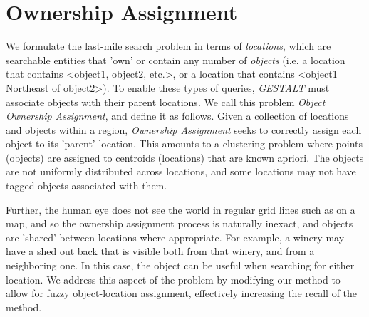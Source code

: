 \section{Ownership Assignment}
\label{section:ownership}

We formulate the last-mile search problem in terms of \textit{locations}, which are searchable entities that 'own' or contain any number of \textit{objects} (i.e. a location that contains <object1, object2, etc.>, or a location that contains <object1 Northeast of object2>). 
To enable these types of queries, \emph{GESTALT} must associate objects with their parent locations.
We call this problem \textit{Object Ownership Assignment}, and define it as follows.
Given a collection of locations and objects within a region, \emph{Ownership Assignment} seeks to correctly assign each object to its 'parent' location. 
This amounts to a clustering problem where points (objects) are assigned to centroids (locations) that are known apriori. 
The objects are not uniformly distributed across locations, and some locations may not have tagged objects associated with them. 


Further, the human eye does not see the world in regular grid lines such as on a map, and so the ownership assignment process is naturally inexact, and objects are 'shared' between locations where appropriate.
For example, a winery may have a shed out back that is visible both from that winery, and from a neighboring one. 
In this case, the object can be useful when searching for either location. 
We address this aspect of the problem by modifying our method to allow for fuzzy object-location assignment, effectively increasing the recall of the method. 


